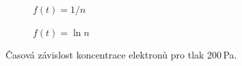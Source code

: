 \documentclass[a4paper,12pt]{article}
\begin{document}
\begin{figure}[h]
	\centering
	\begin{subfigure}[b]{.49\linewidth}
		\centering
		\caption{$f(t) = 1/n$}
	\end{subfigure}
	\begin{subfigure}[b]{.49\linewidth}
		\centering
		\caption{$f(t) = \ln n$}
	\end{subfigure}
	\caption{Časová závislost koncentrace elektronů pro tlak 200\,Pa.}
	\label{g:200Pa}
\end{figure}
\end{document}
